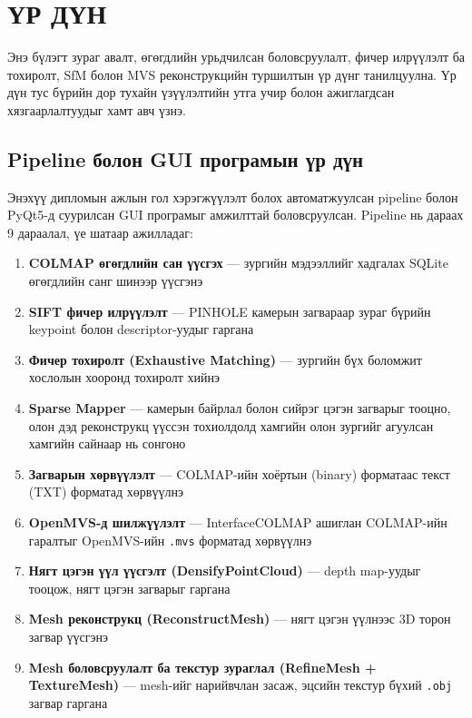\chapter{ҮР ДҮН}

Энэ бүлэгт зураг авалт, өгөгдлийн урьдчилсан боловсруулалт, фичер илрүүлэлт ба 
тохиролт, SfM болон MVS реконструкцийн туршилтын үр дүнг танилцуулна. Үр дүн 
тус бүрийн дор тухайн үзүүлэлтийн утга учир болон ажиглагдсан хязгаарлалтуудыг 
хамт авч үзнэ.

\section{Pipeline болон GUI програмын үр дүн}

Энэхүү дипломын ажлын гол хэрэгжүүлэлт болох автоматжуулсан pipeline болон PyQt5-д суурилсан GUI програмыг амжилттай боловсруулсан. Pipeline нь дараах 9 дараалал, үе шатаар ажилладаг:

\begin{enumerate}
    \item \textbf{COLMAP өгөгдлийн сан үүсгэх} — зургийн мэдээллийг хадгалах SQLite өгөгдлийн санг шинээр үүсгэнэ
    \item \textbf{SIFT фичер илрүүлэлт} — PINHOLE камерын загвараар зураг бүрийн keypoint болон descriptor-уудыг гаргана
    \item \textbf{Фичер тохиролт (Exhaustive Matching)} — зургийн бүх боломжит хослолын хооронд тохиролт хийнэ
    \item \textbf{Sparse Mapper} — камерын байрлал болон сийрэг цэгэн загварыг тооцно, олон дэд реконструкц үүссэн тохиолдолд хамгийн олон зургийг агуулсан хамгийн сайнаар нь сонгоно
    \item \textbf{Загварын хөрвүүлэлт} — COLMAP-ийн хоёртын (binary) форматаас текст (TXT) форматад хөрвүүлнэ
    \item \textbf{OpenMVS-д шилжүүлэлт} — InterfaceCOLMAP ашиглан COLMAP-ийн гаралтыг OpenMVS-ийн \texttt{.mvs} форматад хөрвүүлнэ
    \item \textbf{Нягт цэгэн үүл үүсгэлт (DensifyPointCloud)} — depth map-уудыг тооцож, нягт цэгэн загварыг гаргана
    \item \textbf{Mesh реконструкц (ReconstructMesh)} — нягт цэгэн үүлнээс 3D торон загвар үүсгэнэ
    \item \textbf{Mesh боловсруулалт ба текстур зураглал (RefineMesh + TextureMesh)} — mesh-ийг нарийвчлан засаж, эцсийн текстур бүхий \texttt{.obj} загвар гаргана
\end{enumerate}

